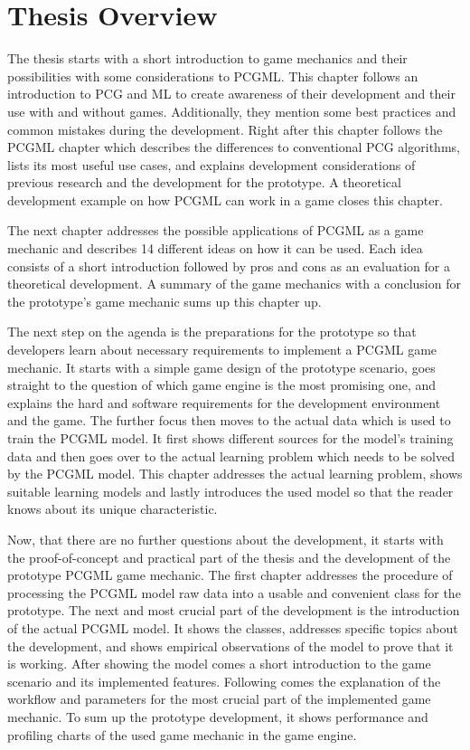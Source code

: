 \documentclass[MGS,Master,english]{twbook}%
\begin{document}
\section{Thesis Overview}
The thesis starts with a short introduction to game mechanics and their possibilities with some considerations to PCGML. This chapter follows an introduction to PCG and ML to create awareness of their development and their use with and without games. Additionally, they mention some best practices and common mistakes during the development. Right after this chapter follows the PCGML chapter which describes the differences to conventional PCG algorithms, lists its most useful use cases, and explains development considerations of previous research and the development for the prototype. A theoretical development example on how PCGML can work in a game closes this chapter.

The next chapter addresses the possible applications of PCGML as a game mechanic and describes 14 different ideas on how it can be used. Each idea consists of a short introduction followed by pros and cons as an evaluation for a theoretical development. A summary of the game mechanics with a conclusion for the prototype's game mechanic sums up this chapter up.

The next step on the agenda is the preparations for the prototype so that developers learn about necessary requirements to implement a PCGML game mechanic. It starts with a simple game design of the prototype scenario, goes straight to the question of which game engine is the most promising one, and explains the hard and software requirements for the development environment and the game. The further focus then moves to the actual data which is used to train the PCGML model. It first shows different sources for the model's training data and then goes over to the actual learning problem which needs to be solved by the PCGML model. This chapter addresses the actual learning problem, shows suitable learning models and lastly introduces the used model so that the reader knows about its unique characteristic.

Now, that there are no further questions about the development, it starts with the proof-of-concept and practical part of the thesis and the development of the prototype PCGML game mechanic. The first chapter addresses the procedure of processing the PCGML model raw data into a usable and convenient class for the prototype. The next and most crucial part of the development is the introduction of the actual PCGML model. It shows the classes, addresses specific topics about the development, and shows empirical observations of the model to prove that it is working. After showing the model comes a short introduction to the game scenario and its implemented features. Following comes the explanation of the workflow and parameters for the most crucial part of the implemented game mechanic. To sum up the prototype development, it shows performance and profiling charts of the used game mechanic in the game engine.
\end{document}
